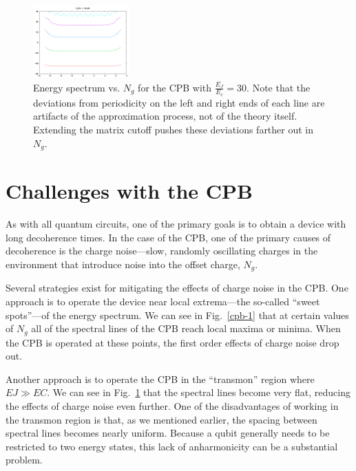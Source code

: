 \documentclass[twocolumn]{revtex4}
\newcommand{\figwidth}{0.33\textwidth}
\begin{document}
\begin{figure}
  \includegraphics[width=\figwidth]{CPB-30.png}
  \caption{Energy spectrum vs. $N_g$ for the CPB with
    $\frac{E_J}{E_c}=30$. Note that the deviations from periodicity on
    the left and right ends of each line are artifacts of the
    approximation process, not of the theory itself. Extending the
    matrix cutoff pushes these deviations farther out in $N_g$.}
  \label{cpb-30}
\end{figure}

\section{Challenges with the CPB}
As with all quantum circuits, one of the primary goals is to obtain a
device with long decoherence times. In the case of the CPB, one of the
primary causes of decoherence is the charge noise---slow, randomly
oscillating charges in the environment that introduce noise into the
offset charge, $N_g$.

Several strategies exist for mitigating the effects of charge noise in
the CPB. One approach is to operate the device near local
extrema---the so-called ``sweet spots''---of the energy
spectrum\cite{Vion}. We can see in Fig.~\ref{cpb-1} that at certain
values of $N_g$ all of the spectral lines of the CPB reach local
maxima or minima. When the CPB is operated at these points, the first
order effects of charge noise drop out.

Another approach is to operate the CPB in the ``transmon'' region
where $EJ\gg EC$\cite{Koch}. We can see in Fig.~\ref{cpb-30} that the
spectral lines become very flat, reducing the effects of charge noise
even further. One of the disadvantages of working in the transmon
region is that, as we mentioned earlier, the spacing between spectral
lines becomes nearly uniform. Because a qubit generally needs to be
restricted to two energy states, this lack of anharmonicity can be a
substantial problem.
\end{document}
